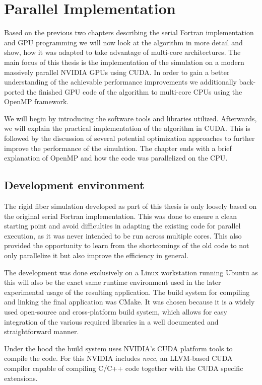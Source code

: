 \documentclass[a4paper,11pt]{kth-mag}
\begin{document}
\chapter{Parallel Implementation}
\label{cha:parallel_implementation}

Based on the previous two chapters describing the serial Fortran implementation and GPU programming we will now look at the algorithm in more detail and show, how it was adapted to take advantage of multi-core architectures. The main focus of this thesis is the implementation of the simulation on a modern massively parallel NVIDIA GPUs using CUDA. In order to gain a better understanding of the achievable performance improvements we additionally back-ported the finished GPU code of the algorithm to multi-core CPUs using the OpenMP framework.

We will begin by introducing the software tools and libraries utilized. Afterwards, we will explain the practical implementation of the algorithm in CUDA. This is followed by the discussion of several potential optimization approaches to further improve the performance of the simulation. The chapter ends with a brief explanation of OpenMP and how the code was parallelized on the CPU.

\section{Development environment}

The rigid fiber simulation developed as part of this thesis is only loosely based on the original serial Fortran implementation. This was done to ensure a clean starting point and avoid difficulties in adapting the existing code for parallel execution, as it was never intended to be run across multiple cores. This also provided the opportunity to learn from the shortcomings of the old code to not only parallelize it but also improve the efficiency in general.

The development was done exclusively on a Linux workstation running Ubuntu as this will also be the exact same runtime environment used in the later experimental usage of the resulting application. The build system for compiling and linking the final application was CMake. It was chosen because it is a widely used open-source and cross-platform build system, which allows for easy integration of the various required libraries in a well documented and straightforward manner.

Under the hood the build system uses NVIDIA's CUDA platform tools to compile the code. For this NVIDIA includes \emph{nvcc}, an LLVM-based CUDA compiler capable of compiling C/C++ code together with the CUDA specific extensions.
\end{document}
